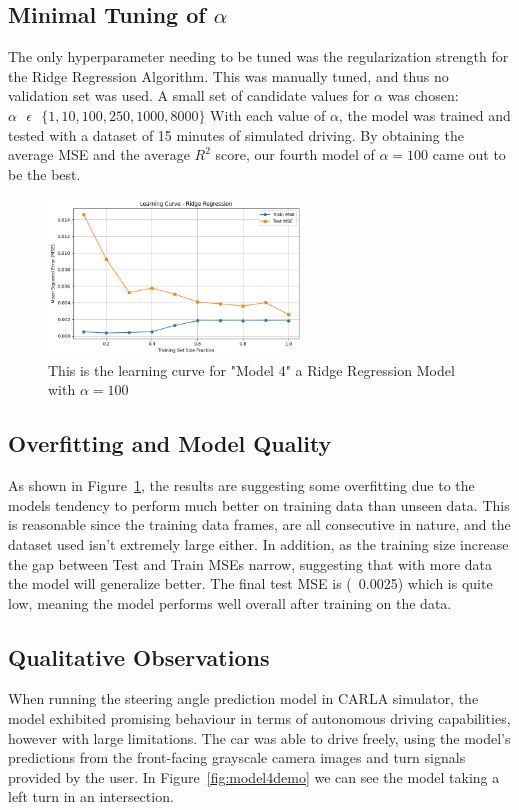\documentclass{article} %
\begin{document}
\subsection{Minimal Tuning of $\alpha$}
The only hyperparameter needing to be tuned was the regularization strength for the Ridge Regression Algorithm. This was manually tuned,
and thus no validation set was used. A small set of candidate values for $\alpha$ was chosen: $\alpha \text{ } \epsilon \text{ } 
\{ 1, 10, 100, 250, 1000, 8000\}$ With each value of $\alpha$, the model was trained and tested with a dataset of 15 minutes of simulated
driving. By obtaining the average MSE and the average $R^2$ score, our fourth model of $\alpha = 100$ came out to be the best. 


\begin{figure}[H] %
    \centering
    \includegraphics[width=0.6\textwidth]{model4learningcurve.png} %
    \caption{This is the learning curve for "Model 4" a Ridge Regression Model with $\alpha = 100$}
    \label{fig:model4learningcurve}
\end{figure}

\subsection{Overfitting and Model Quality}
As shown in Figure~\ref{fig:model4learningcurve}, the results are suggesting some overfitting due to the models tendency
to perform much better on training data than unseen data. This is reasonable since the training data frames, 
are all consecutive in nature, and the dataset used isn't extremely large either. In addition, as the training size
increase the gap between Test and Train MSEs narrow, suggesting that with more data the model will generalize better. 
The final test MSE is (~0.0025) which is quite low, meaning the model performs well overall after training on the data.


\subsection{Qualitative Observations}
When running the steering angle prediction model in CARLA simulator, the model exhibited promising behaviour in terms of
autonomous driving capabilities, however with large limitations. The car was able to drive freely, using the model's predictions
from the front-facing grayscale camera images and turn signals provided by the user. In Figure~\ref{fig:model4demo} we can see 
the model taking a left turn in an intersection.
\end{document}
